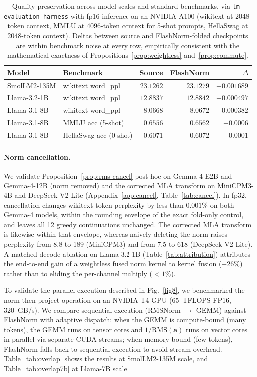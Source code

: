 \documentclass{article}
\begin{document}
\begin{table}[h!] \centering
\caption{Quality preservation across model scales and standard benchmarks, via \texttt{lm-evaluation-harness} with fp16 inference on an NVIDIA A100 (wikitext at 2048-token context, MMLU at 4096-token context for 5-shot prompts, HellaSwag at 2048-token context). Deltas between source and FlashNorm-folded checkpoints are within benchmark noise at every row, empirically consistent with the mathematical exactness of Propositions~\ref{prop:weightless} and~\ref{prop:commute}.}
\label{tab:quality}
\begin{tabular}{l l r r r}
\hline
Model & Benchmark & Source & FlashNorm & $\Delta$ \\
\hline
SmolLM2-135M & wikitext word\_ppl          & $23.1262$ & $23.1279$ & $+0.001689$ \\
Llama-3.2-1B & wikitext word\_ppl          & $12.8837$ & $12.8842$ & $+0.000497$ \\
Llama-3.1-8B & wikitext word\_ppl          & $8.0668$  & $8.0672$  & $+0.000382$ \\
Llama-3.1-8B & MMLU acc (5-shot)           & $0.6556$  & $0.6562$  & $+0.0006$ \\
Llama-3.1-8B & HellaSwag acc (0-shot)      & $0.6071$  & $0.6072$  & $+0.0001$ \\
\hline
\end{tabular}
\end{table}

\paragraph{Norm cancellation.} We validate Proposition~\ref{prop:rms-cancel} post-hoc on Gemma-4-E2B and Gemma-4-12B (norm removed) and the corrected MLA transform on MiniCPM3-4B and DeepSeek-V2-Lite (Appendix~\ref{app:cancel}, Table~\ref{tab:cancel}). In fp32, cancellation changes wikitext token perplexity by less than $0.001\%$ on both Gemma-4 models, within the rounding envelope of the exact fold-only control, and leaves all 12 greedy continuations unchanged. The corrected MLA transform is likewise within that envelope, whereas naively deleting the norm raises perplexity from 8.8 to 189 (MiniCPM3) and from 7.5 to 618 (DeepSeek-V2-Lite). A matched decode ablation on Llama-3.2-1B (Table~\ref{tab:attribution}) attributes the end-to-end gain of a weightless fused norm kernel to kernel fusion ($+26\%$) rather than to eliding the per-channel multiply ($<1\%$).

To validate the parallel execution described in Fig.~\ref{fig8}, we benchmarked the norm-then-project operation on an NVIDIA T4 GPU (65~TFLOPS FP16, 320~GB/s). We compare sequential execution (RMSNorm $\rightarrow$ GEMM) against FlashNorm with adaptive dispatch: when the GEMM is compute-bound (many tokens), the GEMM runs on tensor cores and $1/\mathrm{RMS}(\mathbf{a})$ runs on vector cores in parallel via separate CUDA streams; when memory-bound (few tokens), FlashNorm falls back to sequential execution to avoid stream overhead. Table~\ref{tab:overlap} shows the results at SmolLM2-135M scale, and Table~\ref{tab:overlap7b} at Llama-7B scale.
\end{document}

